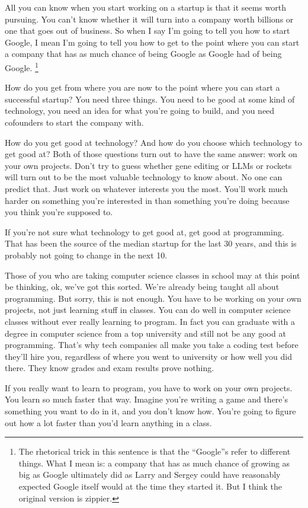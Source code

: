 All you can know when you start working on a startup is that it seems
worth pursuing. You can't know whether it will turn into a company worth
billions or one that goes out of business. So when I say I'm going to
tell you how to start Google, I mean I'm going to tell you how to get to
the point where you can start a company that has as much chance of being
Google as Google had of being Google. \footnote{The rhetorical trick in this sentence is that the ``Google''s
refer to different things. What I mean is: a company that has as much
chance of growing as big as Google ultimately did as Larry and Sergey
could have reasonably expected Google itself would at the time they
started it. But I think the original version is zippier.}

How do you get from where you are now to the point where you can start a
successful startup? You need three things. You need to be good at some
kind of technology, you need an idea for what you're going to build, and
you need cofounders to start the company with.

How do you get good at technology? And how do you choose which
technology to get good at? Both of those questions turn out to have the
same answer: work on your own projects. Don't try to guess whether gene
editing or LLMs or rockets will turn out to be the most valuable
technology to know about. No one can predict that. Just work on whatever
interests you the most. You'll work much harder on something you're
interested in than something you're doing because you think you're
supposed to.

If you're not sure what technology to get good at, get good at
programming. That has been the source of the median startup for the last
30 years, and this is probably not going to change in the next 10.

Those of you who are taking computer science classes in school may at
this point be thinking, ok, we've got this sorted. We're already being
taught all about programming. But sorry, this is not enough. You have to
be working on your own projects, not just learning stuff in classes. You
can do well in computer science classes without ever really learning to
program. In fact you can graduate with a degree in computer science from
a top university and still not be any good at programming. That's why
tech companies all make you take a coding test before they'll hire you,
regardless of where you went to university or how well you did there.
They know grades and exam results prove nothing.

If you really want to learn to program, you have to work on your own
projects. You learn so much faster that way. Imagine you're writing a
game and there's something you want to do in it, and you don't know how.
You're going to figure out how a lot faster than you'd learn anything in
a class.

